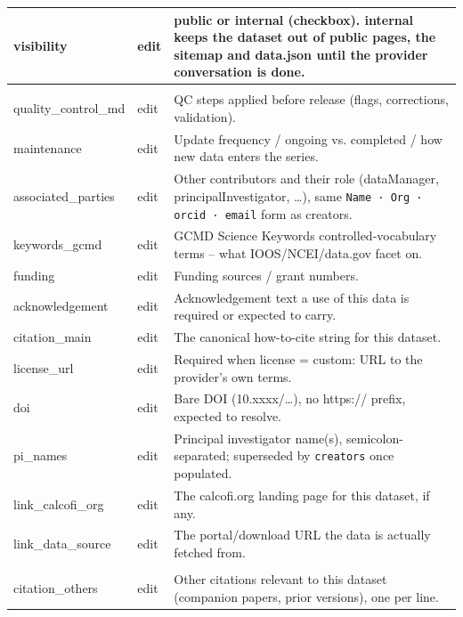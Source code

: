 \documentclass[
  letterpaper,
  DIV=11,
  numbers=noendperiod]{scrreprt}
\begin{document}
\begin{table}
{\begin{tabular*}{\linewidth}{@{\extracolsep{\fill}}lll}
visibility & {\textcolor[HTML]{66686A}{edit}} & public or internal (checkbox). internal keeps the dataset out of public pages, the sitemap and data.json until the provider conversation is done. \\ 
\midrule\addlinespace[2.5pt]
\multicolumn{3}{l}{recommended} \\[2.5pt] 
\midrule\addlinespace[2.5pt]
quality\_control\_md & {\textcolor[HTML]{66686A}{edit}} & QC steps applied before release (flags, corrections, validation). \\ 
maintenance & {\textcolor[HTML]{66686A}{edit}} & Update frequency / ongoing vs. completed / how new data enters the series. \\ 
associated\_parties & {\textcolor[HTML]{66686A}{edit}} & Other contributors and their role (dataManager, principalInvestigator, \ldots{}), same \texttt{Name · Org · orcid · email} form as creators. \\ 
keywords\_gcmd & {\textcolor[HTML]{66686A}{edit}} & GCMD Science Keywords controlled-vocabulary terms -- what IOOS/NCEI/data.gov facet on. \\ 
funding & {\textcolor[HTML]{66686A}{edit}} & Funding sources / grant numbers. \\ 
acknowledgement & {\textcolor[HTML]{66686A}{edit}} & Acknowledgement text a use of this data is required or expected to carry. \\ 
citation\_main & {\textcolor[HTML]{66686A}{edit}} & The canonical how-to-cite string for this dataset. \\ 
license\_url & {\textcolor[HTML]{66686A}{edit}} & Required when license = custom: URL to the provider's own terms. \\ 
doi & {\textcolor[HTML]{66686A}{edit}} & Bare DOI (10.xxxx/\ldots{}), no https:// prefix, expected to resolve. \\ 
pi\_names & {\textcolor[HTML]{66686A}{edit}} & Principal investigator name(s), semicolon-separated; superseded by \texttt{creators} once populated. \\ 
link\_calcofi\_org & {\textcolor[HTML]{66686A}{edit}} & The calcofi.org landing page for this dataset, if any. \\ 
link\_data\_source & {\textcolor[HTML]{66686A}{edit}} & The portal/download URL the data is actually fetched from. \\ 
\midrule\addlinespace[2.5pt]
\multicolumn{3}{l}{optional} \\[2.5pt] 
\midrule\addlinespace[2.5pt]
citation\_others & {\textcolor[HTML]{66686A}{edit}} & Other citations relevant to this dataset (companion papers, prior versions), one per line. \\ 

\end{tabular*}}
\end{table}
\end{document}
